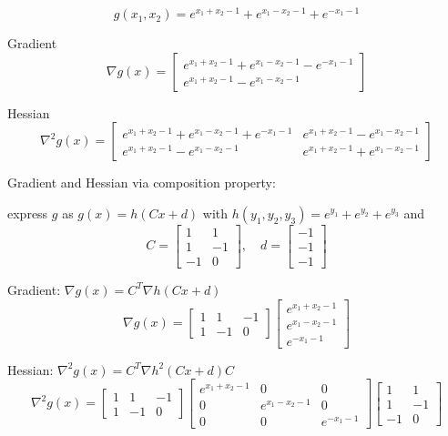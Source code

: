 \begin{example}
    $$ g\left(x_{1}, x_{2}\right)=e^{x_{1}+x_{2}-1}+e^{x_{1}-x_{2}-1}+e^{-x_{1}-1} $$

    Gradient
$$
\nabla g(x)=\left[\begin{array}{c}
e^{x_{1}+x_{2}-1}+e^{x_{1}-x_{2}-1}-e^{-x_{1}-1} \\
e^{x_{1}+x_{2}-1}-e^{x_{1}-x_{2}-1}
\end{array}\right]
$$

Hessian
$$
\nabla^{2} g(x)=\left[\begin{array}{cc}
e^{x_{1}+x_{2}-1}+e^{x_{1}-x_{2}-1}+e^{-x_{1}-1} & e^{x_{1}+x_{2}-1}-e^{x_{1}-x_{2}-1} \\
e^{x_{1}+x_{2}-1}-e^{x_{1}-x_{2}-1} & e^{x_{1}+x_{2}-1}+e^{x_{1}-x_{2}-1}
\end{array}\right]
$$

Gradient and Hessian via composition property:

express $ g $ as $ g(x)=h(C x+d) $ with $ h\left(y_{1}, y_{2}, y_{3}\right)=e^{y_{1}}+e^{y_{2}}+e^{y_{3}} $ and
$$
C=\left[\begin{array}{rr}
1 & 1 \\
1 & -1 \\
-1 & 0
\end{array}\right], \quad d=\left[\begin{array}{l}
-1 \\
-1 \\
-1
\end{array}\right]
$$

Gradient: $ \nabla g(x)=C^{T} \nabla h(C x+d) $
$$
\nabla g(x)=\left[\begin{array}{rrr}
1 & 1 & -1 \\
1 & -1 & 0
\end{array}\right]\left[\begin{array}{c}
e^{x_{1}+x_{2}-1} \\
e^{x_{1}-x_{2}-1} \\
e^{-x_{1}-1}
\end{array}\right]
$$

Hessian: $ \nabla^{2} g(x)=C^{T} \nabla h^{2}(C x+d) C $
$$
\nabla^{2} g(x)=\left[\begin{array}{rrr}
1 & 1 & -1 \\
1 & -1 & 0
\end{array}\right]\left[\begin{array}{ccc}
e^{x_{1}+x_{2}-1} & 0 & 0 \\
0 & e^{x_{1}-x_{2}-1} & 0 \\
0 & 0 & e^{-x_{1}-1}
\end{array}\right]\left[\begin{array}{rr}
1 & 1 \\
1 & -1 \\
-1 & 0
\end{array}\right]
$$
\end{example}

